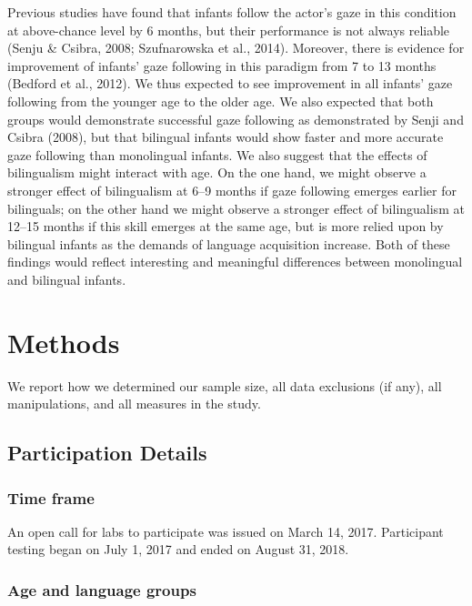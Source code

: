\documentclass[,man,floatsintext]{apa6}
\begin{document}
Previous studies have found that infants follow the actor's gaze in this condition at above-chance level by 6 months, but their performance is not always reliable (Senju \& Csibra, 2008; Szufnarowska et al., 2014). Moreover, there is evidence for improvement of infants' gaze following in this paradigm from 7 to 13 months (Bedford et al., 2012). We thus expected to see improvement in all infants' gaze following from the younger age to the older age. We also expected that both groups would demonstrate successful gaze following as demonstrated by Senji and Csibra (2008), but that bilingual infants would show faster and more accurate gaze following than monolingual infants. We also suggest that the effects of bilingualism might interact with age. On the one hand, we might observe a stronger effect of bilingualism at 6--9 months if gaze following emerges earlier for bilinguals; on the other hand we might observe a stronger effect of bilingualism at 12--15 months if this skill emerges at the same age, but is more relied upon by bilingual infants as the demands of language acquisition increase. Both of these findings would reflect interesting and meaningful differences between monolingual and bilingual infants.

\hypertarget{methods}{%
\section{Methods}\label{methods}}

We report how we determined our sample size, all data exclusions (if any), all manipulations, and all measures in the study.

\hypertarget{participation-details}{%
\subsection{Participation Details}\label{participation-details}}

\hypertarget{time-frame}{%
\subsubsection{Time frame}\label{time-frame}}

An open call for labs to participate was issued on March 14, 2017. Participant testing began on July 1, 2017 and ended on August 31, 2018.

\hypertarget{age-and-language-groups}{%
\subsubsection{Age and language groups}\label{age-and-language-groups}}
\end{document}
